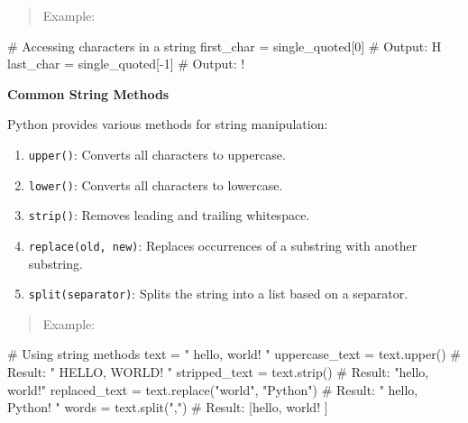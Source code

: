 \documentclass[
  letterpaper,
  DIV=11,
  numbers=noendperiod]{scrreprt}
\newenvironment{Shaded}{\begin{snugshade}}{\end{snugshade}}
\newcommand{\CommentTok}[1]{\textcolor[rgb]{0.37,0.37,0.37}{#1}}
\newcommand{\DecValTok}[1]{\textcolor[rgb]{0.68,0.00,0.00}{#1}}
\newcommand{\NormalTok}[1]{\textcolor[rgb]{0.00,0.23,0.31}{#1}}
\newcommand{\OperatorTok}[1]{\textcolor[rgb]{0.37,0.37,0.37}{#1}}
\newcommand{\StringTok}[1]{\textcolor[rgb]{0.13,0.47,0.30}{#1}}
\providecommand{\tightlist}{%
  \setlength{\itemsep}{0pt}\setlength{\parskip}{0pt}}\usepackage{longtable,booktabs,array}
\theoremstyle{plain}
\theoremstyle{definition}
\theoremstyle{remark}
\begin{document}
\begin{quote}
Example:
\end{quote}

\begin{Shaded}
\begin{Highlighting}[]
\CommentTok{\# Accessing characters in a string}
\NormalTok{first\_char }\OperatorTok{=}\NormalTok{ single\_quoted[}\DecValTok{0}\NormalTok{]  }\CommentTok{\# Output: \textquotesingle{}H\textquotesingle{}}
\NormalTok{last\_char }\OperatorTok{=}\NormalTok{ single\_quoted[}\OperatorTok{{-}}\DecValTok{1}\NormalTok{]  }\CommentTok{\# Output: \textquotesingle{}!\textquotesingle{}}
\end{Highlighting}
\end{Shaded}

\textbf{Common String Methods}

Python provides various methods for string manipulation:

\begin{enumerate}
\def\labelenumi{\arabic{enumi}.}
\tightlist
\item
  \texttt{upper()}: Converts all characters to uppercase.
\item
  \texttt{lower()}: Converts all characters to lowercase.
\item
  \texttt{strip()}: Removes leading and trailing whitespace.
\item
  \texttt{replace(old,\ new)}: Replaces occurrences of a substring with
  another substring.
\item
  \texttt{split(separator)}: Splits the string into a list based on a
  separator.
\end{enumerate}

\begin{quote}
Example:
\end{quote}

\begin{Shaded}
\begin{Highlighting}[]
\CommentTok{\# Using string methods}
\NormalTok{text }\OperatorTok{=} \StringTok{"   hello, world!   "}
\NormalTok{uppercase\_text }\OperatorTok{=}\NormalTok{ text.upper()       }\CommentTok{\# Result: "   HELLO, WORLD!   "}
\NormalTok{stripped\_text }\OperatorTok{=}\NormalTok{ text.strip()        }\CommentTok{\# Result: "hello, world!"}
\NormalTok{replaced\_text }\OperatorTok{=}\NormalTok{ text.replace(}\StringTok{"world"}\NormalTok{, }\StringTok{"Python"}\NormalTok{)  }\CommentTok{\# Result: "   hello, Python!   "}
\NormalTok{words }\OperatorTok{=}\NormalTok{ text.split(}\StringTok{","}\NormalTok{)             }\CommentTok{\# Result: [\textquotesingle{}hello\textquotesingle{}, \textquotesingle{} world!   \textquotesingle{}]}
\end{Highlighting}
\end{Shaded}
\end{document}

